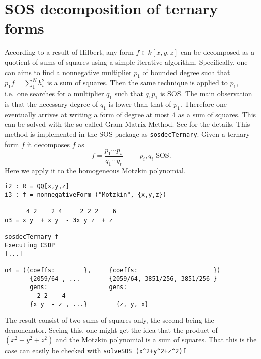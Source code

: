 \documentclass[11pt]{amsart}
\theoremstyle{plain}%
\theoremstyle{definition}
\theoremstyle{remark}
\newcommand{\SOS}{\textsc{SOS}\xspace}
\begin{document}
\section{SOS decomposition of ternary forms}

According to a result of Hilbert, any form $f\in k[x,y,z]$ can be decomposed as a quotient of sums of squares using a simple iterative algorithm.
Specifically, one can aims to find a nonnegative multiplier $p_{1}$ of bounded degree such that $p_{1}f = \sum_{1}^{N}h_{i}^{2}$ is a sum of squares.
Then the same technique is applied to $p_{1}$, i.e.~one searches for a multiplier $q_{1}$ such that $q_{1}p_{1}$ is SOS.
The main observation is that the necessary degree of $q_{1}$ is lower than that of $p_{1}$.
Therefore one eventually arrives at writing a form of degree at most 4 as a sum of squares.
This can be solved with the so called Gram-Matrix-Method.
See \cite{de2004products} for the details.
This method is implemented in the \SOS package as \verb|sosdecTernary|.  Given a ternary form $f$ it decomposes $f$ as
\[
  f = \frac{p_{1}\cdots p_{s}}{q_{1}\cdots q_{t}} \qquad \text {
    $p_{i},q_{i}$ SOS}.
\]
Here we apply it to the homogeneous Motzkin polynomial.
{\small
\begin{verbatim}
i2 : R = QQ[x,y,z]
i3 : f = nonnegativeForm ("Motzkin", {x,y,z})

      4 2    2 4     2 2 2    6
o3 = x y  + x y  - 3x y z  + z

sosdecTernary f
Executing CSDP
[...]

o4 = ({coeffs:        },     {coeffs:                     })
       {2059/64 , ...        {2059/64, 3851/256, 3851/256 }
       gens:                 gens:
         2 2    4              
       {x y  - z , ...}        {z, y, x}
\end{verbatim}
}
The result consist of two sums of squares only, the second being the denomenator.
Seeing this, one might get the idea that the product of $(x^{2}+y^{2}+z^{2})$ and the Motzkin polynomial is a sum of squares.
That this is the case can easily be checked with \verb|solveSOS (x^2+y^2+z^2)f|


\end{document}
